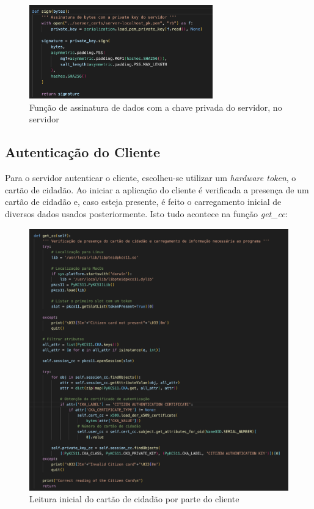 \documentclass[10pt,english]{article}
\begin{document}
\begin{figure}[!h]
        \centering
        \includegraphics[width=300]{images/sign_server.png}
        \caption{Função de assinatura de dados com a chave privada do servidor, no servidor}
\end{figure}

\clearpage

\subsection{Autenticação do Cliente}

\par Para o servidor autenticar o cliente, escolheu-se utilizar um \textit{hardware token}, o cartão de cidadão. Ao iniciar a aplicação do cliente é verificada a presença de um cartão de cidadão e, caso esteja presente, é feito o carregamento inicial de diversos dados usados posteriormente. Isto tudo acontece na função \textit{get\_cc}:

\begin{figure}[!h]
        \centering
        \includegraphics[width=450]{images/get_cc_client.png}
        \caption{Leitura inicial do cartão de cidadão por parte do cliente}
\end{figure}
\end{document}
